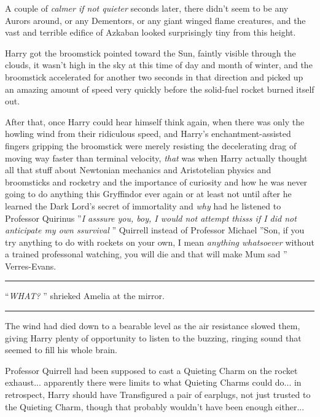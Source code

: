 A couple of \emph{calmer if not quieter} seconds later, there didn't
seem to be any Aurors around, or any Dementors, or any giant winged
flame creatures, and the vast and terrible edifice of Azkaban looked
surprisingly tiny from this height.

Harry got the broomstick pointed toward the Sun, faintly visible through
the clouds, it wasn't high in the sky at this time of day and month of
winter, and the broomstick accelerated for another two seconds in that
direction and picked up an amazing amount of speed very quickly before
the solid-fuel rocket burned itself out.

After that, once Harry could hear himself think again, when there was
only the howling wind from their ridiculous speed, and Harry's
enchantment-assisted fingers gripping the broomstick were merely
resisting the decelerating drag of moving way faster than terminal
velocity, \emph{that} was when Harry actually thought all that stuff
about Newtonian mechanics and Aristotelian physics and broomsticks and
rocketry and the importance of curiosity and how he was never going to
do anything this Gryffindor ever again or at least not until after he
learned the Dark Lord's secret of immortality and \emph{why} had he
listened to Professor Quirinus ''\emph{I asssure you, boy, I would not
attempt thisss if I did not anticipate my own ssurvival} '' Quirrell
instead of Professor Michael ''Son, if you try anything to do with
rockets on your own, I mean \emph{anything whatsoever} without a trained
professonal watching, you will die and that will make Mum sad ''
Verres-Evans.

\begin{center}\rule{3in}{0.4pt}\end{center}

``\emph{WHAT?} '' shrieked Amelia at the mirror.

\begin{center}\rule{3in}{0.4pt}\end{center}

The wind had died down to a bearable level as the air resistance slowed
them, giving Harry plenty of opportunity to listen to the buzzing,
ringing sound that seemed to fill his whole brain.

Professor Quirrell had been supposed to cast a Quieting Charm on the
rocket exhaust... apparently there were limits to what Quieting
Charms could do... in retrospect, Harry should have Transfigured a
pair of earplugs, not just trusted to the Quieting Charm, though that
probably wouldn't have been enough either...

